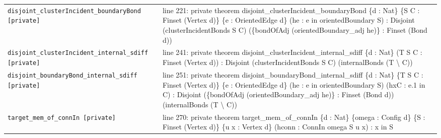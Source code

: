\documentclass[10pt]{article}
\begin{document}
\begin{longtable}{>{\raggedright\arraybackslash}p{} >{\raggedright\arraybackslash}p{}}
\texttt{disjoint\_\allowbreak{}clusterIncident\_\allowbreak{}boundaryBond [private]} & {\ttfamily\scriptsize line 221:\allowbreak{} private theorem disjoint\_\allowbreak{}clusterIncident\_\allowbreak{}boundaryBond \{d :\allowbreak{} Nat\} \{S C :\allowbreak{} Finset (\allowbreak{}Vertex d)\allowbreak{}\} \{e :\allowbreak{} OrientedEdge d\} (\allowbreak{}he :\allowbreak{} e in orientedBoundary S)\allowbreak{} :\allowbreak{} Disjoint (\allowbreak{}clusterIncidentBonds S C)\allowbreak{} (\allowbreak{}\{bondOfAdj (\allowbreak{}orientedBoundary\_\allowbreak{}adj he)\allowbreak{}\} :\allowbreak{} Finset (\allowbreak{}Bond d)\allowbreak{})\allowbreak{}} \\[0.45em]
\texttt{disjoint\_\allowbreak{}clusterIncident\_\allowbreak{}internal\_\allowbreak{}sdiff [private]} & {\ttfamily\scriptsize line 241:\allowbreak{} private theorem disjoint\_\allowbreak{}clusterIncident\_\allowbreak{}internal\_\allowbreak{}sdiff \{d :\allowbreak{} Nat\} (\allowbreak{}T S C :\allowbreak{} Finset (\allowbreak{}Vertex d)\allowbreak{})\allowbreak{} :\allowbreak{} Disjoint (\allowbreak{}clusterIncidentBonds S C)\allowbreak{} (\allowbreak{}internalBonds (\allowbreak{}T \textbackslash{} C)\allowbreak{})\allowbreak{}} \\[0.45em]
\texttt{disjoint\_\allowbreak{}boundaryBond\_\allowbreak{}internal\_\allowbreak{}sdiff [private]} & {\ttfamily\scriptsize line 251:\allowbreak{} private theorem disjoint\_\allowbreak{}boundaryBond\_\allowbreak{}internal\_\allowbreak{}sdiff \{d :\allowbreak{} Nat\} \{T S C :\allowbreak{} Finset (\allowbreak{}Vertex d)\allowbreak{}\} \{e :\allowbreak{} OrientedEdge d\} (\allowbreak{}he :\allowbreak{} e in orientedBoundary S)\allowbreak{} (\allowbreak{}hxC :\allowbreak{} e.\allowbreak{}1 in C)\allowbreak{} :\allowbreak{} Disjoint (\allowbreak{}\{bondOfAdj (\allowbreak{}orientedBoundary\_\allowbreak{}adj he)\allowbreak{}\} :\allowbreak{} Finset (\allowbreak{}Bond d)\allowbreak{})\allowbreak{} (\allowbreak{}internalBonds (\allowbreak{}T \textbackslash{} C)\allowbreak{})\allowbreak{}} \\[0.45em]
\texttt{target\_\allowbreak{}mem\_\allowbreak{}of\_\allowbreak{}connIn [private]} & {\ttfamily\scriptsize line 270:\allowbreak{} private theorem target\_\allowbreak{}mem\_\allowbreak{}of\_\allowbreak{}connIn \{d :\allowbreak{} Nat\} \{omega :\allowbreak{} Config d\} \{S :\allowbreak{} Finset (\allowbreak{}Vertex d)\allowbreak{}\} \{u x :\allowbreak{} Vertex d\} (\allowbreak{}hconn :\allowbreak{} ConnIn omega S u x)\allowbreak{} :\allowbreak{} x in S} \\[0.45em]

\end{longtable}
\end{document}
